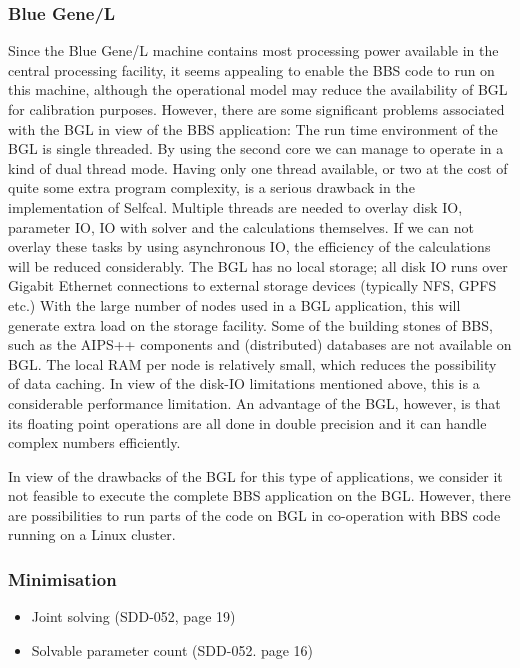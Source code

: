\documentclass[10pt]{lofar}
\begin{document}
\subsubsection{Blue Gene/L}
Since the Blue Gene/L machine contains most processing power available in the central processing facility, it seems appealing to enable the BBS code to run on this machine, although the operational model may reduce the availability of BGL for calibration purposes.
However, there are some significant problems associated with the BGL in view of the BBS application:
The run time environment of the BGL is single threaded. By using the second core we can manage to operate in a kind of dual thread mode. Having only one thread available, or two at the cost of quite some extra program complexity, is a serious drawback in the implementation of Selfcal. Multiple threads are needed to overlay disk IO, parameter IO, IO with solver and the calculations themselves. If we can not overlay these tasks by using asynchronous IO, the efficiency of the calculations will be reduced considerably.
The BGL has no local storage; all disk IO runs over Gigabit Ethernet connections to external storage devices (typically NFS, GPFS etc.) With the large number of nodes used in a BGL application, this will generate extra load on the storage facility.
Some of the building stones of BBS, such as the AIPS++ components and (distributed) databases are not available on BGL.
The local RAM per node is relatively small, which reduces the possibility of data caching. In view of the disk-IO limitations mentioned above, this is a considerable performance limitation.
An advantage of the BGL, however, is that its floating point operations are all done in double precision and it can handle complex numbers efficiently.

In view of the drawbacks of the BGL for this type of applications, we consider it not feasible to execute the complete BBS application on the BGL.
However, there are possibilities to run parts of the code on BGL in co-operation with BBS code running on a Linux cluster.


\subsubsection{Minimisation}
\begin{itemize}
\item Joint solving (SDD-052, page 19)
\item Solvable parameter count (SDD-052. page 16)
\end{itemize}
\end{document}
